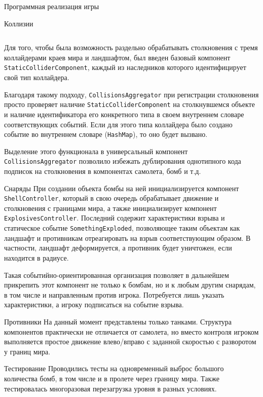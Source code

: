 \begin{section}{Программная реализация игры}
\begin{subsection}{Коллизии}
			\inputminted{cpp}{listings/AircraftCollisionExample.cpp}

			Для того, чтобы была возможность раздельно обрабатывать столкновения с тремя коллайдерами краев мира и ландшафтом, был введен базовый компонент \verb|StaticColliderComponent|, каждый из наследников которого идентифицирует свой тип коллайдера.

			Благодаря такому подходу, \verb|CollisionsAggregator| при регистрации столкновения просто проверяет наличие \verb|StaticColliderComponent| на столкнувшемся объекте и наличие идентификатора его конкретного типа в своем внутреннем словаре соответствующих событий.
			Если для этого типа коллайдера было создано событие во внутреннем словаре (\verb|HashMap|), то оно будет вызвано.

			Выделение этого функционала в универсальный компонент \verb|CollisionsAggregator| позволило избежать дублирования однотипного кода подписок на столкновения в компонентах самолета, бомб и т.д.
		\end{subsection}

		\begin{subsection}{Снаряды}
			При создании объекта бомбы на ней инициализируется компонент \verb|ShellController|, который в свою очередь обрабатывает движение и столкновения с границами мира, а также инициализирует компонент \verb|ExplosivesController|.
			Последний содержит характеристики взрыва и статическое событие \verb|SomethingExploded|, позволяющее таким объектам как ландшафт и противникам отреагировать на взрыв соответствующим образом.
			В частности, ландшафт деформируется, а противник будет уничтожен, если находится в радиусе.

			Такая событийно-ориентированная организация позволяет в дальнейшем прикрепить этот компонент не только к бомбам, но и к любым другим снарядам, в том числе и направленным против игрока.
			Потребуется лишь указать характеристики, а игроку подписаться на событие взрыва.
		\end{subsection}

		\begin{subsection}{Противники}
			На данный момент представлены только танками.
			Структура компонентов практически не отличается от самолета, но вместо контроля игроком выполняется простое движение влево/вправо с заданной скоростью с разворотом у границ мира.
		\end{subsection}

		\begin{subsection}{Тестирование}
			Проводились тесты на одновременный выброс большого количества бомб, в том числе и в пролете через границу мира.
			Также тестировалась многоразовая перезагрузка уровня в разных условиях.


\end{subsection}
\end{section}
